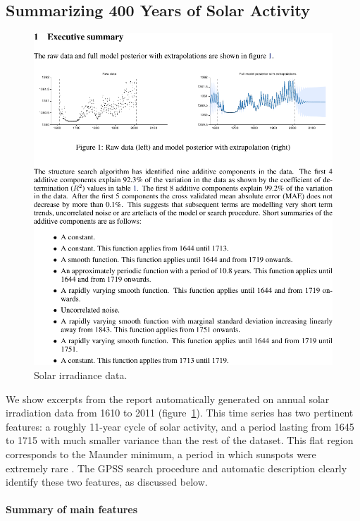 \documentclass{article}
\begin{document}
\subsection{Summarizing 400 Years of Solar Activity}
\label{sec:solar}

\begin{figure}[h]
\centering
\includegraphics[trim=0cm 11.0cm 9cm 1.7cm, clip, width=0.98\columnwidth]{solarpages/02-solar-seperate-pages-2}
\caption{
Solar irradiance data.}
\label{fig:solar}
\end{figure}

We show excerpts from the report automatically generated on annual solar irradiation data from 1610 to 2011 (figure~\ref{fig:solar}).
This time series has two pertinent features: a roughly 11-year cycle of solar activity, and a period lasting from 1645 to 1715 with much smaller variance than the rest of the dataset.  This flat region corresponds to the Maunder minimum, a period in which sunspots were extremely rare \citep{lean1995reconstruction}.
The GPSS search procedure and automatic description clearly identify these two features, as discussed below.

\paragraph{Summary of main features}
\end{document}
